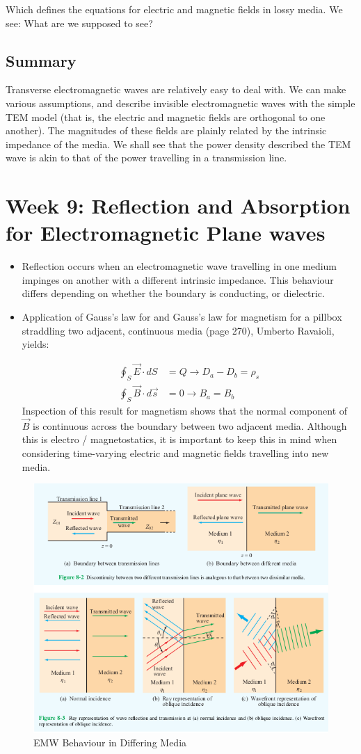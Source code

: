 \documentclass{book}
\begin{document}
Which defines the equations for electric and magnetic fields in lossy media. We see: What are we supposed to see?

\subsection{Summary}

Transverse electromagnetic waves are relatively easy to deal with. We can make various assumptions, and describe invisible electromagnetic waves with the simple TEM model (that is, the electric and magnetic fields are orthogonal to one another). The magnitudes of these fields are plainly related by the intrinsic impedance of the media. We shall see that the power density described the TEM wave is akin to that of the power travelling in a transmission line.

\section{Week 9: Reflection and Absorption for Electromagnetic Plane waves}


\begin{itemize}
	\item Reflection occurs when an electromagnetic wave travelling in one medium impinges on another with a different intrinsic impedance. This behaviour differs depending on whether the boundary is conducting, or dielectric.
	\item Application of Gauss's law for and Gauss's law for magnetism for a pillbox straddling two adjacent, continuous media (page 270), Umberto Ravaioli, yields:
	
	\begin{align*}
		\oint_S \vec{E} \cdot dS &= Q \xrightarrow{} D_{a} - {D_b} = \rho_s \\
		\oint_S \vec{B} \cdot d\vec{s} &= 0 \xrightarrow{}  B_a = B_b
	\end{align*}
	Inspection of this result for magnetism shows that the normal component of $\vec{B}$ is continuous across the boundary between two adjacent media. Although this is electro / magnetostatics, it is important to keep this in mind when considering time-varying electric and magnetic fields travelling into new media.
\end{itemize}

\begin{figure}[h]
	\centering
	\includegraphics[width=0.5\linewidth]{Screenshots/emw_behaviour_different_media}
	\caption{EMW Behaviour in Differing Media}
	\label{fig:emwbehaviourdifferentmedia}
\end{figure}
\end{document}

